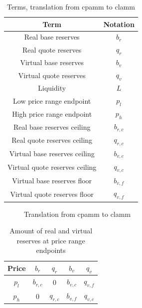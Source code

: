 \documentclass[table, twocolumn]{article}
\begin{document}
\begin{table}[!htb]
  \centering
  \begin{tabular}{|c|c|}
    \hline \rowcolor{blue}
    Term                           & Notation  \\ \hline
    Real base reserves             & $b_r$     \\ \hline
    Real quote reserves            & $q_r$     \\ \hline
    Virtual base reserves          & $b_v$     \\ \hline
    Virtual quote reserves         & $q_v$     \\ \hline
    Liquidity                      & $L$       \\ \hline
    Low price range endpoint       & $p_l$     \\ \hline
    High price range endpoint      & $p_h$     \\ \hline
    Real base reserves ceiling     & $b_{r,c}$ \\ \hline
    Real quote reserves ceiling    & $q_{r,c}$ \\ \hline
    Virtual base reserves ceiling  & $b_{v,c}$ \\ \hline
    Virtual quote reserves ceiling & $q_{v,c}$ \\ \hline
    Virtual base reserves floor    & $b_{v,f}$ \\ \hline
    Virtual quote reserves floor   & $q_{v,f}$ \\ \hline
  \end{tabular}
  \caption{Terms, translation from \gls{cpamm} to \gls{clamm}}
  \label{tab:clamm-curve-translation}
\end{table}

\begin{figure}[!htb]
  \centering
  
  \caption{Translation from \gls{cpamm} to \gls{clamm}}
  \label{fig:clamm-curve-translation}
\end{figure}

\begin{table}[!htb]
  \centering
  \begin{tabular}{|c|c|c|c|c|}
    \hline \rowcolor{blue}
    Price & $b_r$      & $q_r$        & $b_v$      & $q_v$      \\ \hline
    $p_l$ & $b_{r, c}$ & 0            & $b_{v, c}$ & $q_{v, f}$ \\ \hline
    $p_h$ & 0          & ${q_{r, c}}$ & $b_{v, f}$ & $q_{v, c}$ \\ \hline
  \end{tabular}
  \caption{Amount of real and virtual reserves at price range endpoints}
  \label{tab:clamm-curve-endpoint-reserves}
\end{table}
\end{document}
